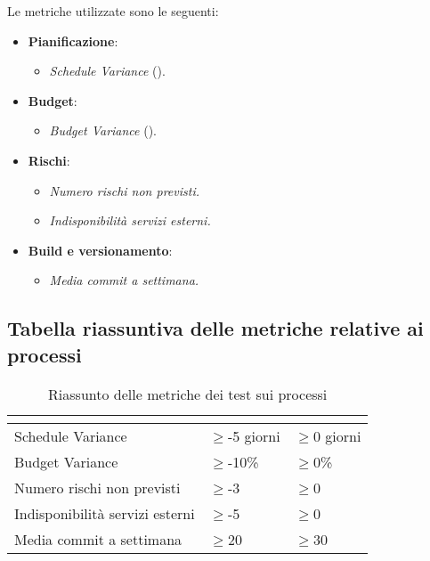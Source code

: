 Le metriche utilizzate sono le seguenti:
\begin{itemize}
	\item{\textbf{Pianificazione}: 
		\begin{itemize}
			\item{\emph{Schedule Variance} ().}
		\end{itemize}
	}
	\item{\textbf{Budget}: 
		\begin{itemize}
			\item{\emph{Budget Variance} ().}
		\end{itemize}	
	}
	\item{\textbf{Rischi}:
		\begin{itemize}
			\item\emph{Numero rischi non previsti.}
			\item\emph{Indisponibilità servizi esterni.}	
		\end{itemize}	
	}
	\item{\textbf{Build e versionamento}: 
		\begin{itemize}
			\item\emph{Media commit a settimana.}
		\end{itemize}	
	}
\end{itemize}

\subsection{Tabella riassuntiva delle metriche relative ai processi}
\renewcommand{\arraystretch}{1.5}
\begin{table}[H]
	\centering
	\begin{tabular}{|C{5cm}|C{4cm}|C{4cm}|}
		\hline
		\textbf{\color{title_text}{Nome Metrica}} &  \textbf{\color{title_text}{Range accettabile}} & \textbf{\color{title_text}{Range ottimale}} \\ \hline
		Schedule Variance & $\geq$-5 giorni  & $\geq$0 giorni \\ \hline
		Budget Variance&$\geq$-10\% &$\geq$0\% \\ \hline
		Numero rischi non previsti&$\geq$-3 &$\geq$0 \\ \hline
		Indisponibilità servizi esterni&$\geq$-5 &$\geq$0 \\ \hline
		Media commit a settimana&$\geq$20 &$\geq$30 \\ \hline

	\end{tabular}
	\caption{Riassunto delle metriche dei test sui processi}
	\label{tabella:riassunto metriche dei test sui processi}
\end{table}
\renewcommand{\arraystretch}{1}

